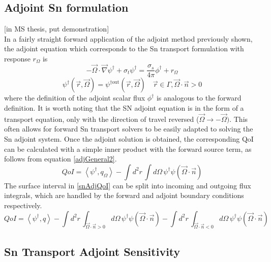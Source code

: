 \documentclass{article}
\newcommand{\vr}{\vec{r}}
\newcommand{\vO}{\vec{\Omega}}
\newcommand{\bra}{\left\langle}
\newcommand{\ket}{\right\rangle}
\newcommand{\vgrad}{\vec{\nabla}}
\newcommand{\sigt}{\sigma_t}
\newcommand{\sigs}{\sigma_s}
\newcommand{\angSource}{q_\Omega}
\newcommand{\angResp}{r_\Omega}
\begin{document}
\subsection{Adjoint Sn formulation}
[in MS thesis, put demonstration]\\

In a fairly straight forward application of the adjoint method previously shown, the adjoint equation which corresponds to the Sn transport formulation with response $\angResp$ is
\begin{equation}
\label{snAdj}
- \vO \cdot \vgrad \psi^\dag + \sigt \psi^\dag = \frac{\sigs}{4 \pi} \phi^\dag + \angResp
\end{equation}
%
\begin{equation}
\psi^\dag(\vr,\vO) = \psi^{\dag \text{out}}(\vr,\vO) \quad \vr \in \Gamma, \vO \cdot \vec{n} > 0
\end{equation}
where the definition of the adjoint scalar flux $\phi^\dag$ is analogous to the forward definition. It is worth noting that the SN adjoint equation is in the form of a transport equation, only with the direction of travel reversed ($\vO \to -\vO)$. This often allows for forward Sn transport solvers to be easily adapted to solving the Sn adjoint system. Once the adjoint solution is obtained, the corresponding QoI can be calculated with a simple inner product with the forward source term, as follows from equation \ref{adjGeneral2}. 
%
\begin{equation}
\label{snAdjQoI}
QoI = \bra \psi^\dag , \angSource \ket - \int d^2 r \, \int d  \Omega \, \psi^\dag \psi ( \vO \cdot \vec{n} )
\end{equation}
%
The surface interval in \ref{snAdjQoI} can be split into incoming and outgoing flux integrals, which are handled by the forward and adjoint boundary conditions respectively. 
%
\begin{equation}
QoI = \bra \psi^\dag , q \ket - \int d^2 r \, \int_{\vO \cdot \vec{n} >0} d  \Omega \, \psi^\dag \psi ( \vO \cdot \vec{n} ) - \int d^2 r \, \int_{\vO \cdot \vec{n} <0} d  \Omega \, \psi^\dag \psi ( \vO \cdot \vec{n} )
\end{equation}

\subsection{Sn Transport Adjoint Sensitivity}
\end{document}
